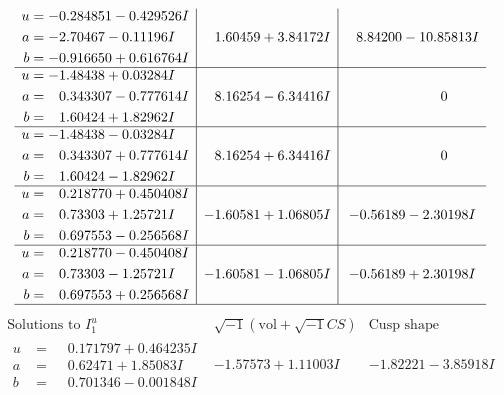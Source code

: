 \documentclass[1p]{elsarticle_modified}
\theoremstyle{definition}
\newcommand{\I}{\sqrt{-1}}
\begin{document}
$$\begin{array}{c|c|c}
\begin{aligned}
u &= -0.284851 - 0.429526 I \\
a &= -2.70467 - 0.11196 I \\
b &= -0.916650 + 0.616764 I\end{aligned}
 & \phantom{-}1.60459 + 3.84172 I & \phantom{-}8.84200 - 10.85813 I \\ \hline\begin{aligned}
u &= -1.48438 + 0.03284 I \\
a &= \phantom{-}0.343307 - 0.777614 I \\
b &= \phantom{-}1.60424 + 1.82962 I\end{aligned}
 & \phantom{-}8.16254 - 6.34416 I & \phantom{-0.000000 } 0 \\ \hline\begin{aligned}
u &= -1.48438 - 0.03284 I \\
a &= \phantom{-}0.343307 + 0.777614 I \\
b &= \phantom{-}1.60424 - 1.82962 I\end{aligned}
 & \phantom{-}8.16254 + 6.34416 I & \phantom{-0.000000 } 0 \\ \hline\begin{aligned}
u &= \phantom{-}0.218770 + 0.450408 I \\
a &= \phantom{-}0.73303 + 1.25721 I \\
b &= \phantom{-}0.697553 - 0.256568 I\end{aligned}
 & -1.60581 + 1.06805 I & -0.56189 - 2.30198 I \\ \hline\begin{aligned}
u &= \phantom{-}0.218770 - 0.450408 I \\
a &= \phantom{-}0.73303 - 1.25721 I \\
b &= \phantom{-}0.697553 + 0.256568 I\end{aligned}
 & -1.60581 - 1.06805 I & -0.56189 + 2.30198 I\\
 \hline 
 \end{array}$$\newpage$$\begin{array}{c|c|c}  
\text{Solutions to }I^u_{1}& \I (\text{vol} + \sqrt{-1}CS) & \text{Cusp shape}\\
 \hline 
\begin{aligned}
u &= \phantom{-}0.171797 + 0.464235 I \\
a &= \phantom{-}0.62471 + 1.85083 I \\
b &= \phantom{-}0.701346 - 0.001848 I\end{aligned}
 & -1.57573 + 1.11003 I & -1.82221 - 3.85918 I \\ \hline\begin{aligned}

\end{aligned}
\end{array}$$
\end{document}
